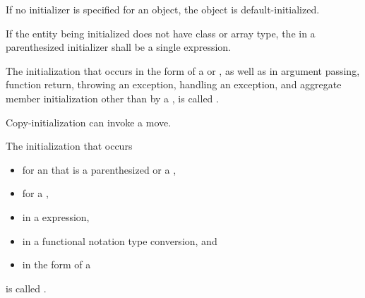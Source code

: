 \pnum
If no initializer is specified for an object, the object is default-initialized.

\pnum
If the entity being initialized does not have class or array type, the
 in a
parenthesized initializer shall be a single expression.

\pnum
{}%
%
The initialization that occurs in the \tcode{=} form of a
 or
,
as well as in argument passing, function return,
throwing an exception,
handling an exception,
and aggregate member initialization other than by a
,
is called
.
\begin{note}
Copy-initialization can invoke a move.
\end{note}

\pnum
The initialization that occurs
\begin{itemize}
\item for an  that is a
parenthesized  or a ,
\item for a ,
\item in a  expression,
\item in a functional notation type conversion, and
\item in the  form of a 
\end{itemize}
is called
.

